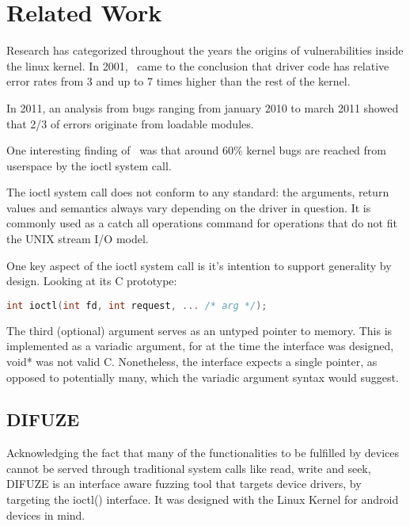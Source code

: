\section{Related Work}\label{s:related-work}


Research has categorized throughout the years the origins of
vulnerabilities inside the linux kernel. In 2001,~\cite{chouEmpiricalStudyOperating2001}
came to the conclusion that driver code has relative error rates
from 3 and up to 7 times higher than the rest of the kernel.

In 2011, an analysis from bugs ranging from january 2010 to march 2011
showed that 2/3 of errors originate from loadable modules\cite{chenLinuxKernelVulnerabilities2011}.

One interesting finding of~\cite{vanderstoepAndroidProtectingKernel2016} was that around 60\% kernel bugs
are reached from userspace by the ioctl system call.

The ioctl system call does not conform to any standard: the arguments, return values and semantics always vary
depending on the driver in question. It is commonly used as a catch all operations command for
operations that do not fit the UNIX stream I/O model.

One key aspect of the ioctl system call is it's intention to support generality by design.
Looking at its C prototype:

\begin{lstlisting}[language=c]
  int ioctl(int fd, int request, ... /* arg */);
\end{lstlisting}

The third (optional) argument serves as an untyped pointer to memory. This is implemented as a variadic argument, for at the time
the interface was designed, void* was not valid C. Nonetheless, the interface expects a single pointer, as opposed to potentially
many, which the variadic argument syntax would suggest.

\subsection{DIFUZE}\label{ss:difuze}

Acknowledging the fact that many of the functionalities to be fulfilled
by devices cannot be served through traditional system calls like read, write
and seek, DIFUZE is an interface aware fuzzing tool that targets
device drivers, by targeting the ioctl() interface\cite{corinaDIFUZEInterfaceAware2017}.
It was designed with the Linux Kernel for android devices in mind.

